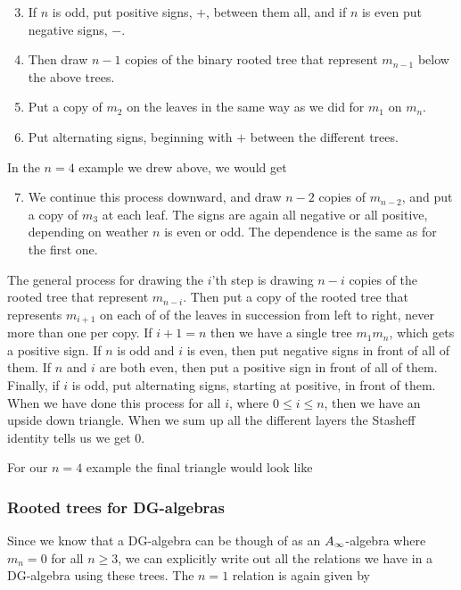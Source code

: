 \begin{enumerate}
\setcounter{enumi}{2}
    \item If $n$ is odd, put positive signs, $+$, between them all, and if $n$ is even put negative signs, $-$. 
    \item Then draw $n-1$ copies of the binary rooted tree that represent $m_{n-1}$ below the above trees. \item Put a copy of $m_2$ on the leaves in the same way as we did for $m_1$ on $m_n$.
    \item Put alternating signs, beginning with $+$ between the different trees.
\end{enumerate}

In the $n=4$ example we drew above, we would get


\begin{enumerate}
\setcounter{enumi}{6}
    \item We continue this process downward, and draw $n-2$ copies of $m_{n-2}$, and put a copy of $m_3$ at each leaf. The signs are again all negative or all positive, depending on weather $n$ is even or odd. The dependence is the same as for the first one. 
\end{enumerate}

The general process for drawing the $i$'th step is drawing $n-i$ copies of the rooted tree that represent $m_{n-i}$. Then put a copy of the rooted tree that represents $m_{i+1}$ on each of of the leaves in succession from left to right, never more than one per copy. If $i+1=n$ then we have a single tree $m_1 m_{n}$, which gets a positive sign. If $n$ is odd and $i$ is even, then put negative signs in front of all of them. If $n$ and $i$ are both even, then put a positive sign in front of all of them. Finally, if $i$ is odd, put alternating signs, starting at positive, in front of them. When we have done this process for all $i$, where $0\leq i \leq n$, then we have an upside down triangle. When we sum up all the different layers the Stasheff identity tells us we get $0$. 

For our $n=4$ example the final triangle would look like



\subsubsection{Rooted trees for DG-algebras}

Since we know that a DG-algebra can be though of as an $A_{\infty}$-algebra where $m_n = 0$ for all $n\geq 3$, we can explicitly write out all the relations we have in a DG-algebra using these trees. The $n=1$ relation is again given by


